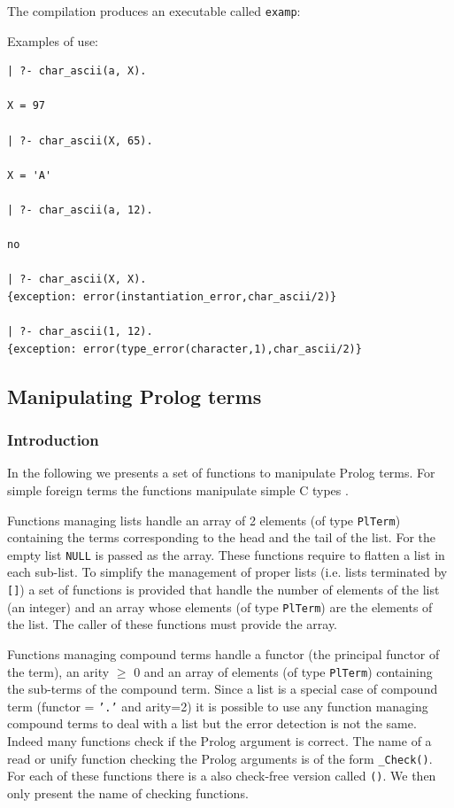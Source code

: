 The compilation produces an executable called \texttt{examp}:


Examples of use:

\begin{Code}
\begin{verbatim}
| ?- char_ascii(a, X).

X = 97

| ?- char_ascii(X, 65).

X = 'A'

| ?- char_ascii(a, 12).

no

| ?- char_ascii(X, X).
{exception: error(instantiation_error,char_ascii/2)}

| ?- char_ascii(1, 12).
{exception: error(type_error(character,1),char_ascii/2)}
\end{verbatim}
\end{Code}

\subsection{Manipulating Prolog terms}
\label{Manipulating-Prolog-terms}

\subsubsection{Introduction}
\label{Introduction:(Manipulating-Prolog-terms)}
In the following we presents a set of functions to manipulate Prolog terms.
For simple foreign terms the functions manipulate simple C types
.

Functions managing lists handle an array of 2 elements (of type
\texttt{PlTerm}) containing the terms corresponding to the head and the tail
of the list. For the empty list \texttt{NULL} is passed as the array. These
functions require to flatten a list in each sub-list. To simplify the
management of proper lists (i.e. lists terminated by \texttt{[]}) a set of
functions is provided that handle the number of elements of the list (an
integer) and an array whose elements (of type \texttt{PlTerm}) are the
elements of the list. The caller of these functions must provide the array.

Functions managing compound terms handle a functor (the principal functor of
the term), an arity  $\geq$ 0 and an array of  elements
(of type \texttt{PlTerm}) containing the sub-terms of the compound term.
Since a list is a special case of compound term (functor = \texttt{'.'} and
arity=2) it is possible to use any function managing compound terms to deal
with a list but the error detection is not the same. Indeed many functions
check if the Prolog argument is correct. The name of a read or unify
function checking the Prolog arguments is of the form
\texttt{\_Check()}. For each of these functions there is a also
check-free version called \texttt{()}. We then only present the
name of checking functions.

